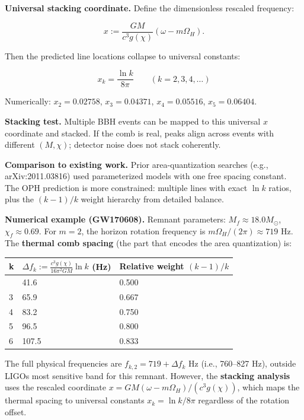 \textbf{Universal stacking coordinate.} Define the dimensionless rescaled frequency:

\[
x := \frac{GM}{c^3 g(\chi)}(\omega - m\Omega_H).
\]

Then the predicted line locations collapse to universal constants:

\[
x_k = \frac{\ln k}{8\pi} \qquad (k = 2, 3, 4, \ldots)
\]

Numerically: \(x_2 = 0.02758\), \(x_3 = 0.04371\), \(x_4 = 0.05516\), \(x_5 = 0.06404\).

\textbf{Stacking test.} Multiple BBH events can be mapped to this universal \(x\) coordinate and stacked. If the comb is real, peaks align across events with different \((M, \chi)\); detector noise does not stack coherently.

\textbf{Comparison to existing work.} Prior area-quantization searches (e.g., arXiv:2011.03816) used parameterized models with one free spacing constant. The OPH prediction is more constrained: multiple lines with exact \(\ln k\) ratios, plus the \((k-1)/k\) weight hierarchy from detailed balance.

\textbf{Numerical example (GW170608).} Remnant parameters: \(M_f \approx 18.0 M_\odot\), \(\chi_f \approx 0.69\). For \(m = 2\), the horizon rotation frequency is \(m\Omega_H/(2\pi) \approx 719\) Hz. The \textbf{thermal comb spacing} (the part that encodes the area quantization) is:

{\def\LTcaptype{none} %
\begin{longtable}[]{@{}lll@{}}
\toprule\noalign{}
k & \(\Delta f_k := \frac{c^3 g(\chi)}{16\pi^2 GM} \ln k\) (Hz) & Relative weight \((k-1)/k\) \\
\midrule\noalign{}
\endhead
\bottomrule\noalign{}
\endlastfoot
2 & 41.6 & 0.500 \\
3 & 65.9 & 0.667 \\
4 & 83.2 & 0.750 \\
5 & 96.5 & 0.800 \\
6 & 107.5 & 0.833 \\
\end{longtable}
}

The full physical frequencies are \(f_{k,2} = 719 + \Delta f_k\) Hz (i.e., 760--827 Hz), outside LIGO\textquotesingle s most sensitive band for this remnant. However, the \textbf{stacking analysis} uses the rescaled coordinate \(x = GM(\omega -
m\Omega_H)/(c^3 g(\chi))\), which maps the thermal spacing to universal constants \(x_k = \ln k / 8\pi\) regardless of the rotation offset.


